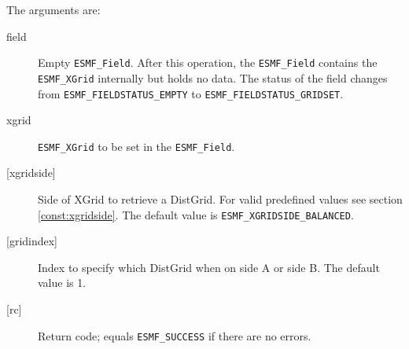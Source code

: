   
   The arguments are:
   \begin{description}
   \item [field]
   \begin{sloppypar}
   Empty {\tt ESMF\_Field}. After this
   operation, the {\tt ESMF\_Field} contains
   the {\tt ESMF\_XGrid} internally but holds no data.
   The status of the field changes from
   {\tt ESMF\_FIELDSTATUS\_EMPTY} to {\tt ESMF\_FIELDSTATUS\_GRIDSET}.
   \end{sloppypar}
   \item [xgrid]
   {\tt ESMF\_XGrid} to be set in the {\tt ESMF\_Field}.
   \item [{[xgridside]}]
   Side of XGrid to retrieve a DistGrid. For valid
   predefined values see section \ref{const:xgridside}.
   The default value is {\tt ESMF\_XGRIDSIDE\_BALANCED}.
   \item [{[gridindex]}]
   Index to specify which DistGrid when on side A or side B.
   The default value is 1.
   \item [{[rc]}]
   Return code; equals {\tt ESMF\_SUCCESS} if there are no errors.
   \end{description}
  
\setlength{\parskip}{\oldparskip}
\setlength{\parindent}{\oldparindent}
\setlength{\baselineskip}{\oldbaselineskip}
